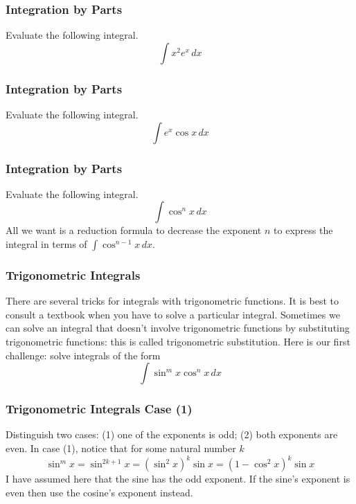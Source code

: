 \documentclass[xcolor=dvipsnames]{beamer}
\begin{document}
\begin{frame}
  \frametitle{Integration by Parts}
  {\ubung} Evaluate the following integral.
  \begin{equation}
    \label{eq:oizaixea}
    \int{}x^{2}e^{x}\,dx
  \end{equation}
\end{frame}

\begin{frame}
  \frametitle{Integration by Parts}
  {\ubung} Evaluate the following integral.
  \begin{equation}
    \label{eq:nohceira}
    \int{}e^{x}\cos{}x\,dx
  \end{equation}
\end{frame}

\begin{frame}
  \frametitle{Integration by Parts}
  {\ubung} Evaluate the following integral.
  \begin{equation}
    \label{eq:aemahjoo}
    \int\cos^{n}x\,dx
  \end{equation}
  All we want is a \alert{reduction formula} to decrease the exponent
  $n$ to express the integral in terms of $\int\cos^{n-1}x\,dx$.
\end{frame}

\begin{frame}
  \frametitle{Trigonometric Integrals}
  There are several tricks for integrals with trigonometric functions.
  It is best to consult a textbook when you have to solve a particular
  integral. Sometimes we can solve an integral that doesn't involve
  trigonometric functions by substituting trigonometric functions:
  this is called trigonometric substitution. Here is our first
  challenge: solve integrals of the form
  \begin{equation}
    \label{eq:iepheith}
    \int\sin^{m}x\cos^{n}x\,dx
  \end{equation}
\end{frame}

\begin{frame}
  \frametitle{Trigonometric Integrals Case (1)}
  Distinguish two cases: (1) one of the exponents is odd; (2) both
  exponents are even. In case (1), notice that for
  some natural number $k$
  \begin{equation}
    \label{eq:oghufohx}
    \sin^{m}x=\sin^{2k+1}x=(\sin^{2}x)^{k}\sin{}x=(1-\cos^{2}x)^{k}\sin{}x
  \end{equation}
  I have assumed here that the sine has the odd exponent. If the
  sine's exponent is even then use the cosine's exponent instead.
\end{frame}
\end{document}
